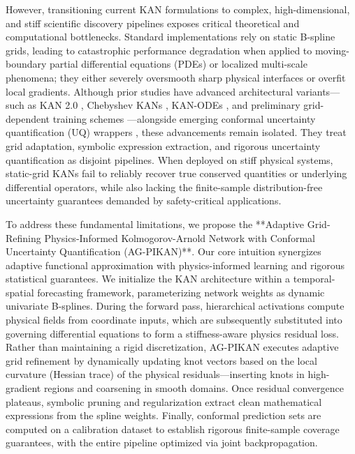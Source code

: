 \documentclass[10pt,twocolumn]{article}
\begin{document}
However, transitioning current KAN formulations to complex, high-dimensional, and stiff scientific discovery pipelines exposes critical theoretical and computational bottlenecks. Standard implementations rely on static B-spline grids, leading to catastrophic performance degradation when applied to moving-boundary partial differential equations (PDEs) or localized multi-scale phenomena; they either severely oversmooth sharp physical interfaces or overfit local gradients. Although prior studies have advanced architectural variants—such as KAN 2.0 \cite{target_ref}, Chebyshev KANs \cite{ref_5}, KAN-ODEs \cite{ref_4}, and preliminary grid-dependent training schemes \cite{ref_3}—alongside emerging conformal uncertainty quantification (UQ) wrappers \cite{ref_1}, these advancements remain isolated. They treat grid adaptation, symbolic expression extraction, and rigorous uncertainty quantification as disjoint pipelines. When deployed on stiff physical systems, static-grid KANs fail to reliably recover true conserved quantities or underlying differential operators, while also lacking the finite-sample distribution-free uncertainty guarantees demanded by safety-critical applications.

To address these fundamental limitations, we propose the **Adaptive Grid-Refining Physics-Informed Kolmogorov-Arnold Network with Conformal Uncertainty Quantification (AG-PIKAN)**. Our core intuition synergizes adaptive functional approximation with physics-informed learning and rigorous statistical guarantees. We initialize the KAN architecture within a temporal-spatial forecasting framework, parameterizing network weights as dynamic univariate B-splines. During the forward pass, hierarchical activations compute physical fields from coordinate inputs, which are subsequently substituted into governing differential equations to form a stiffness-aware physics residual loss. Rather than maintaining a rigid discretization, AG-PIKAN executes adaptive grid refinement by dynamically updating knot vectors based on the local curvature (Hessian trace) of the physical residuals—inserting knots in high-gradient regions and coarsening in smooth domains. Once residual convergence plateaus, symbolic pruning and regularization extract clean mathematical expressions from the spline weights. Finally, conformal prediction sets are computed on a calibration dataset to establish rigorous finite-sample coverage guarantees, with the entire pipeline optimized via joint backpropagation.
\end{document}
